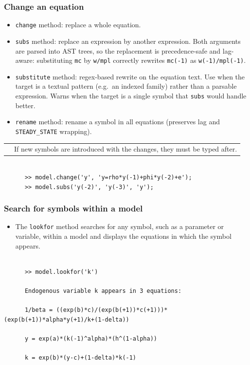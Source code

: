 \documentclass[10pt,slidestop]{beamer}
\makeatletter
\theoremstyle{plain}
\newcommand{\dnote}[1]{%
    \noindent %
    \begin{tabular}{@{}m{0.13\textwidth}@{}m{0.87\textwidth}@{}}%
        \huge\textdbend &#1%
    \end{tabular}%
    \par %
}
\makeatother
\begin{document}
\begin{frame}[c,fragile]
  \frametitle{Change an equation}

  \begin{itemize}
  \item \verb+change+ method: replace a whole equation.
  \item \verb+subs+ method: replace an expression by another expression. Both arguments are parsed into AST trees, so the replacement is precedence-safe and lag-aware: substituting \verb+mc+ by \verb+w/mpl+ correctly rewrites \verb+mc(-1)+ as \verb+w(-1)/mpl(-1)+.
  \item \verb+substitute+ method: regex-based rewrite on the equation text. Use when the target is a textual pattern (e.g.\ an indexed family) rather than a parsable expression. Warns when the target is a single symbol that \verb+subs+ would handle better.
  \item \verb+rename+ method: rename a symbol in all equations (preserves lag and \verb+STEADY_STATE+ wrapping).
  \end{itemize}

    \medskip

    \dnote{If new symbols are introduced with the changes, they must be typed after.}

    \bigskip

    \begin{lstlisting}[style=MatlabConsole]

      >> model.change('y', 'y=rho*y(-1)+phi*y(-2)+e');
      >> model.subs('y(-2)', 'y(-3)', 'y');
  \end{lstlisting}

\end{frame}


\begin{frame}[c,fragile]
  \frametitle{Search for symbols within a model}

  \begin{itemize}

  \item The \verb+lookfor+ method searches for any symbol, such as a parameter or variable, within a model and displays the equations in which the symbol appears.\newline

  \end{itemize}

    \medskip

    \begin{lstlisting}[style=MatlabConsole]

      >> model.lookfor('k')

      Endogenous variable k appears in 3 equations:

      1/beta = ((exp(b)*c)/(exp(b(+1))*c(+1)))*(exp(b(+1))*alpha*y(+1)/k+(1-delta))

      y = exp(a)*(k(-1)^alpha)*(h^(1-alpha))

      k = exp(b)*(y-c)+(1-delta)*k(-1)
  \end{lstlisting}

\end{frame}
\end{document}
